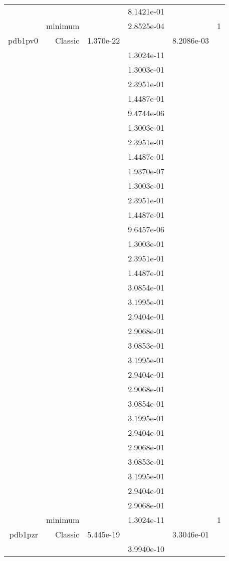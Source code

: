 \begin{xltabular}{\textwidth}{r|rS[table-format=1.3e+2]S[table-format=1.4e+2]S[table-format=1.4e+2]S[table-format=-1.5]}
&  &  & 8.1421e-01 & & \\
& minimum &  & 2.8525e-04 & & 1 \\  \addlinespace
pdb1pv0 & Classic & 1.370e-22 &  & 8.2086e-03 & \\
&  &  & 1.3024e-11 & & \\
&  &  & 1.3003e-01 & & \\
&  &  & 2.3951e-01 & & \\
&  &  & 1.4487e-01 & & \\
&  &  & 9.4744e-06 & & \\
&  &  & 1.3003e-01 & & \\
&  &  & 2.3951e-01 & & \\
&  &  & 1.4487e-01 & & \\
&  &  & 1.9370e-07 & & \\
&  &  & 1.3003e-01 & & \\
&  &  & 2.3951e-01 & & \\
&  &  & 1.4487e-01 & & \\
&  &  & 9.6457e-06 & & \\
&  &  & 1.3003e-01 & & \\
&  &  & 2.3951e-01 & & \\
&  &  & 1.4487e-01 & & \\
&  &  & 3.0854e-01 & & \\
&  &  & 3.1995e-01 & & \\
&  &  & 2.9404e-01 & & \\
&  &  & 2.9068e-01 & & \\
&  &  & 3.0853e-01 & & \\
&  &  & 3.1995e-01 & & \\
&  &  & 2.9404e-01 & & \\
&  &  & 2.9068e-01 & & \\
&  &  & 3.0854e-01 & & \\
&  &  & 3.1995e-01 & & \\
&  &  & 2.9404e-01 & & \\
&  &  & 2.9068e-01 & & \\
&  &  & 3.0853e-01 & & \\
&  &  & 3.1995e-01 & & \\
&  &  & 2.9404e-01 & & \\
&  &  & 2.9068e-01 & & \\
& minimum &  & 1.3024e-11 & & 1 \\  \addlinespace
pdb1pzr & Classic & 5.445e-19 &  & 3.3046e-01 & \\
&  &  & 3.9940e-10 & & \\

\end{xltabular}
